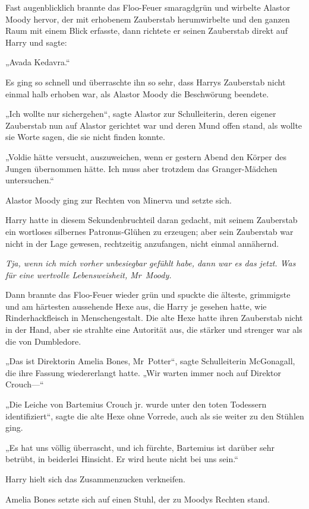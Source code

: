 {Fast augenblicklich brannte das Floo-Feuer smaragdgrün und wirbelte Alastor Moody hervor, der mit erhobenem Zauberstab herumwirbelte und den ganzen Raum mit einem Blick erfasste, dann richtete er seinen Zauberstab direkt auf Harry und sagte:

„Avada Kedavra.“

Es ging so schnell und überraschte ihn so sehr, dass Harrys Zauberstab nicht einmal halb erhoben war, als Alastor Moody die Beschwörung beendete.

„Ich wollte nur sichergehen“, sagte Alastor zur Schulleiterin, deren eigener Zauberstab nun auf Alastor gerichtet war und deren Mund offen stand, als wollte sie Worte sagen, die sie nicht finden konnte.

„Voldie hätte versucht, auszuweichen, wenn er gestern Abend den Körper des Jungen übernommen hätte. Ich muss aber trotzdem das Granger-Mädchen untersuchen.“

Alastor Moody ging zur Rechten von Minerva und setzte sich.

Harry hatte in diesem Sekundenbruchteil daran gedacht, mit seinem Zauberstab ein wortloses silbernes Patronus-Glühen zu erzeugen; aber sein Zauberstab war nicht in der Lage gewesen, rechtzeitig anzufangen, nicht einmal annähernd.

\emph{Tja, wenn ich mich vorher unbesiegbar gefühlt habe, dann war es das jetzt. Was für eine wertvolle Lebensweisheit, Mr~Moody.}

Dann brannte das Floo-Feuer wieder grün und spuckte die älteste, grimmigste und am härtesten aussehende Hexe aus, die Harry je gesehen hatte, wie Rinderhackfleisch in Menschengestalt. Die alte Hexe hatte ihren Zauberstab nicht in der Hand, aber sie strahlte eine Autorität aus, die stärker und strenger war als die von Dumbledore.

„Das ist Direktorin Amelia Bones, Mr~Potter“, sagte Schulleiterin McGonagall, die ihre Fassung wiedererlangt hatte. „Wir warten immer noch auf Direktor Crouch—“

„Die Leiche von Bartemius Crouch jr. wurde unter den toten Todessern identifiziert“, sagte die alte Hexe ohne Vorrede, auch als sie weiter zu den Stühlen ging.

„Es hat uns völlig überrascht, und ich fürchte, Bartemius ist darüber sehr betrübt, in beiderlei Hinsicht. Er wird heute nicht bei uns sein.“

Harry hielt sich das Zusammenzucken verkneifen.

Amelia Bones setzte sich auf einen Stuhl, der zu Moodys Rechten stand.

}
